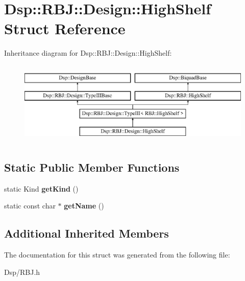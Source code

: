 \hypertarget{structDsp_1_1RBJ_1_1Design_1_1HighShelf}{\section{Dsp\-:\-:R\-B\-J\-:\-:Design\-:\-:High\-Shelf Struct Reference}
\label{structDsp_1_1RBJ_1_1Design_1_1HighShelf}
}
Inheritance diagram for Dsp\-:\-:R\-B\-J\-:\-:Design\-:\-:High\-Shelf\-:\begin{figure}[H]
\begin{center}
\leavevmode
\includegraphics[height=4.000000cm]{structDsp_1_1RBJ_1_1Design_1_1HighShelf}
\end{center}
\end{figure}
\subsection*{Static Public Member Functions}
\begin{DoxyCompactItemize}
\item 
\hypertarget{structDsp_1_1RBJ_1_1Design_1_1HighShelf_aaeee3e275c00be48fc99e6e0898d83cb}{static Kind {\bfseries get\-Kind} ()}\label{structDsp_1_1RBJ_1_1Design_1_1HighShelf_aaeee3e275c00be48fc99e6e0898d83cb}

\item 
\hypertarget{structDsp_1_1RBJ_1_1Design_1_1HighShelf_a92cce5b3b97f1ca6279b27abdf79676e}{static const char $\ast$ {\bfseries get\-Name} ()}\label{structDsp_1_1RBJ_1_1Design_1_1HighShelf_a92cce5b3b97f1ca6279b27abdf79676e}

\end{DoxyCompactItemize}
\subsection*{Additional Inherited Members}


The documentation for this struct was generated from the following file\-:\begin{DoxyCompactItemize}
\item 
Dsp/R\-B\-J.\-h\end{DoxyCompactItemize}
